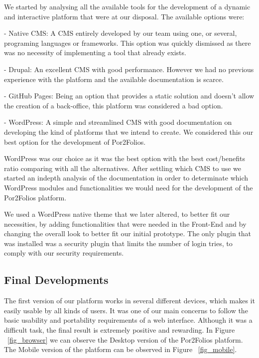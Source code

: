 \documentclass[a4paper,12pt,journal,twoside,compsoc]{PPIEEEtran}
\begin{document}
We started by analysing all the available tools for the development of a dynamic and interactive platform that were at our disposal. The available options were:

- Native \ac{CMS}: A \ac{CMS} entirely developed by our team using one, or several, programing languages or frameworks. This option was quickly dismissed as there was no necessity of implementing a tool that already exists.

- Drupal: An excellent \ac{CMS} with good performance. However we had no previous experience with the platform and the available documentation is scarce.

- GitHub Pages: Being an option that provides a static solution and doesn't allow the creation of a back-office, this platform was considered a bad option.

- WordPress: A simple and streamlined \ac{CMS} with good documentation on developing the kind of platforms that we intend to create. We considered this our best option for the development of Por2Folios.

WordPress was our choice as it was the best option with the best cost/benefits ratio comparing with all the alternatives. After settling which \ac{CMS} to use we started an indepth analysis of the documentation in order to determinate which WordPress modules and functionalities we would need for the development of the Por2Folios platform.

We used a WordPress native theme that we later altered, to better fit our necessities, by adding functionalities that were needed in the Front-End and by changing the overall look to better fit our initial prototype. The only plugin that was installed was a security plugin that limits the number of login tries, to comply with our security requirements.

\clearpage

\subsection{Final Developments}

The first version of our platform works in several different devices, which makes it easily usable by all kinds of users. It was one of our main concerns to follow the basic usability and portability requirements of a web interface. Although it was a difficult task, the final result is extremely positive and rewarding. In Figure ~\ref{fig_browser} we can observe the Desktop version of the Por2Folios platform. The Mobile version of the platform can be observed in Figure ~\ref{fig_mobile}.
\end{document}
